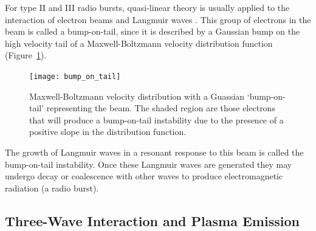 For type II and III radio bursts, quasi-linear theory is usually applied to the interaction of electron beams and Langmuir waves \citep{kontar2001, reid2010, ratcliffe2012}. This group of electrons in the beam is called a bump-on-tail, since it is described by a Gaussian bump on the high velocity tail of a Maxwell-Boltzmann velocity distribution function (Figure~\ref{fig:bot}). 
\begin{figure}[!t] 
\begin{center}
\texttt{[image: bump\_on\_tail]}
\caption[Shock drift acceleration]{Maxwell-Boltzmann velocity distribution with a Guassian `bump-on-tail' representing the beam. The shaded region are those electrons that will produce a bump-on-tail instability due to the presence of a positive slope in the distribution function.}
\label{fig:bot}
\end{center}
\end{figure}
The growth of Langmuir waves in a resonant response to this beam is called the bump-on-tail instability. Once these Langmuir waves are generated they may undergo decay or coalescence with other waves to produce electromagnetic radiation (a radio burst). 


\subsection{Three-Wave Interaction and Plasma Emission}\label{sec:three_wave}

